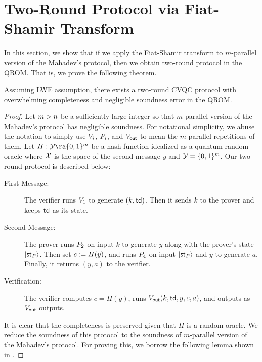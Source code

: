 \section{Two-Round Protocol via Fiat-Shamir Transform}\label{sec:tworound}
In this section, we show that if we apply the Fiat-Shamir transform to $m$-parallel version of the Mahadev's protocol, then we obtain two-round protocol in the QROM. 
That is, we prove the following theorem.
\begin{theorem}\label{thm:MahFS}
Assuming LWE assumption, there exists a two-round CVQC protocol with overwhelming completeness and negligible soundness error in the QROM.
\end{theorem}

\begin{proof}%
Let $m>n$ be a sufficiently large integer so that $m$-parallel version of the Mahadev's protocol has negligible soundness.
For notational simplicity, we abuse the notation to simply use $V_{i}$, $P_{i}$, and $V_{\mathsf{out}}$ to mean the $m$-parallel repetitions of them. 
Let $H:\calY\ra \bit^{m}$ be a hash function idealized as a quantum random oracle where $\mathcal{X}$ is the space of the second message $y$ and $\mathcal{Y}=\{0,1\}^{m}$.
Our two-round protocol is described below:
\begin{description}
\item[First Message:] The verifier runs $V_1$ to generate $(k,\mathsf{td})$. Then it sends $k$ to the prover and keeps $\mathsf{td}$ as its state.
\item[Second Message:] The prover runs $P_2$ on input $k$ to generate $y$ along with the prover's state $\ket{\mathsf{st}_P}$. Then set $c:= H(y)$, and runs $P_4$ on input $\ket{\mathsf{st}_P}$ and $y$ to generate $a$. Finally, it returns $(y,a)$ to the verifier.
\item[Verification:] The verifier computes $c=H(y)$, runs $V_{\mathsf{out}}(k,\mathsf{td},y,c,a)$, and outputs as $V_{\mathsf{out}}$ outputs.
\end{description}

It is clear that the completeness is preserved given that $H$ is a random oracle.
We reduce the soundness of this protocol to the soundness of $m$-parallel version of the Mahadev's protocol.
For proving this, we borrow the following lemma shown in \cite{C:DFMS19}.


\end{proof}
